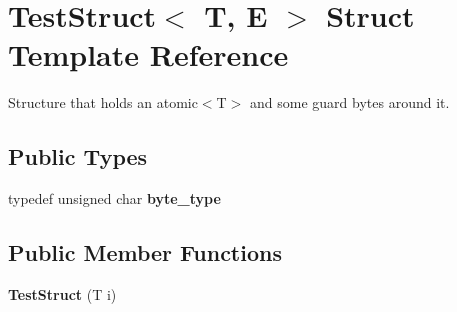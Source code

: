 \hypertarget{structTestStruct}{}\section{Test\+Struct$<$ T, E $>$ Struct Template Reference}
\label{structTestStruct}


Structure that holds an atomic$<$\+T$>$ and some guard bytes around it.  


\subsection*{Public Types}
\begin{DoxyCompactItemize}
\item 
\hypertarget{structTestStruct_a632287926f844a9ebbbc4bafabcd6234}{}typedef unsigned char {\bfseries byte\+\_\+type}\label{structTestStruct_a632287926f844a9ebbbc4bafabcd6234}

\end{DoxyCompactItemize}
\subsection*{Public Member Functions}
\begin{DoxyCompactItemize}
\item 
\hypertarget{structTestStruct_a7d55b0c16cb19aa746bef1115ba13ba2}{}{\bfseries Test\+Struct} (T i)\label{structTestStruct_a7d55b0c16cb19aa746bef1115ba13ba2}

\end{DoxyCompactItemize}
